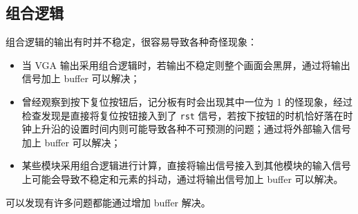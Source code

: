 \documentclass[UTF8, 11pt, fontset=none]{ctexart}
\begin{document}
\subsection{组合逻辑}

组合逻辑的输出有时并不稳定，很容易导致各种奇怪现象：
\begin{itemize}
    \item 当 VGA 输出采用组合逻辑时，若输出不稳定则整个画面会黑屏，通过将输出信号加上 buffer 可以解决；
    \item 曾经观察到按下复位按钮后，记分板有时会出现其中一位为 1 的怪现象，经过检查发现是直接将复位按钮接入到了 \texttt{rst} 信号，若按下按钮的时机恰好落在时钟上升沿的设置时间内则可能导致各种不可预测的问题；通过将外部输入信号加上 buffer 可以解决；
    \item 某些模块采用组合逻辑进行计算，直接将输出信号接入到其他模块的输入信号上可能会导致不稳定和元素的抖动，通过将输出信号加上 buffer 可以解决。
\end{itemize}

可以发现有许多问题都能通过增加 buffer 解决。
\end{document}
